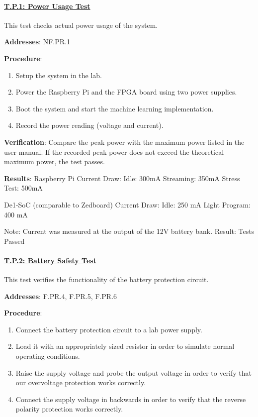 \paragraph{\underline{T.P.1: Power Usage Test}}

This test checks actual power usage of the system.

\textbf{Addresses}: NF.PR.1

\textbf{Procedure}:
\begin{enumerate}[noitemsep]
    \item Setup the system in the lab.
    \item Power the Raspberry Pi and the FPGA board using two power supplies.
    \item Boot the system and start the machine learning implementation.
    \item Record the power reading (voltage and current).
\end{enumerate}

\textbf{Verification}: 
Compare the peak power with the maximum power listed in the user manual. If the recorded peak power does not exceed the theoretical maximum power, the test passes. 

\textbf{Results}:
Raspberry Pi Current Draw:
Idle: 300mA
Streaming: 350mA
Stress Test: 500mA

De1-SoC (comparable to Zedboard) Current Draw:
Idle: 250 mA
Light Program: 400 mA

Note: Current was measured at the output of the 12V battery bank.
Result: Tests Passed


%

\paragraph{\underline{T.P.2: Battery Safety Test}}

This test verifies the functionality of the battery protection circuit.

\textbf{Addresses}: F.PR.4, F.PR.5, F.PR.6

\textbf{Procedure}:
\begin{enumerate}[noitemsep]
    \item Connect the battery protection circuit to a lab power supply.
    \item Load it with an appropriately sized resistor in order to simulate normal operating conditions.
    \item Raise the supply voltage and probe the output voltage in order to verify that our overvoltage protection works correctly.
    \item Connect the supply voltage in backwards in order to verify that the reverse polarity protection works correctly.
\end{enumerate}

